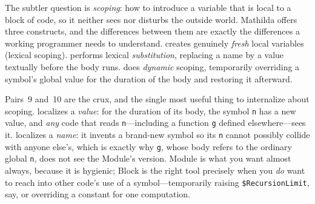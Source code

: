 The subtler question is \emph{scoping}: how to introduce a variable that is local
to a block of code, so it neither sees nor disturbs the outside world. Mathilda
offers three constructs, and the differences between them are exactly the
differences a working programmer needs to understand.  creates genuinely
\emph{fresh} local variables (lexical scoping).  performs lexical
\emph{substitution}, replacing a name by a value textually before the body runs.
 does \emph{dynamic} scoping, temporarily overriding a symbol's global
value for the duration of the body and restoring it afterward.

\begin{codepairs}
\end{codepairs}

Pairs~9 and~10 are the crux, and the single most useful thing to internalize
about scoping.  localizes a \emph{value}: for the duration of its body,
the symbol \texttt{n} has a new value, and \emph{any} code that reads
\texttt{n}---including a function \texttt{g} defined elsewhere---sees it. 
localizes a \emph{name}: it invents a brand-new symbol so its \texttt{n} cannot
possibly collide with anyone else's, which is exactly why \texttt{g}, whose body
refers to the ordinary global \texttt{n}, does not see the Module's version.
Module is what you want almost always, because it is hygienic; Block is the right
tool precisely when you \emph{do} want to reach into other code's use of a symbol---temporarily
raising \texttt{\$RecursionLimit}, say, or overriding a constant for one
computation.

